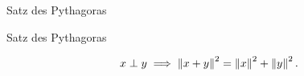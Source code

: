 \documentclass[class=article, crop=false]{standalone}
\begin{document}
\begin{zettel}{Satz des Pythagoras}
\begin{flashcard}[roiqpx39]{Satz des Pythagoras}
	\begin{theorem}
		\[
			x \perp y \implies \left\|x+y\right\|^2 = \left\|x\right\|^2 + \left\|y\right\|^2
		.\]
	\end{theorem}
\end{flashcard}
\end{zettel}
\end{document}
